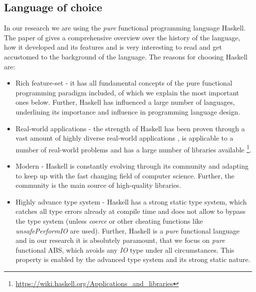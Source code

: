 \subsection{Language of choice}
In our research we are using the \textit{pure} functional programming language Haskell. The paper of \cite{hudak_history_2007} gives a comprehensive overview over the history of the language, how it developed and its features and is very interesting to read and get accustomed to the background of the language. The reasons for choosing Haskell are:

\begin{itemize}
	\item Rich feature-set - it has all fundamental concepts of the pure functional programming paradigm included, of which we explain the most important ones below. Further, Haskell has influenced a large number of languages, underlining its importance and influence in programming language design.
	
	\item Real-world applications - the strength of Haskell has been proven through a vast amount of highly diverse real-world applications \cite{hudak_history_2007, hudak_haskell_1994}, is applicable to a number of real-world problems \cite{osullivan_real_2008} and has a large number of libraries available \footnote{\url{https://wiki.haskell.org/Applications_and_libraries}}.
	
	\item Modern - Haskell is constantly evolving through its community and adapting to keep up with the fast changing field of computer science. Further, the community is the main source of high-quality libraries.
	
	\item Highly advance type system - Haskell has a strong static type system, which catches all type errors already at compile time and does not allow to bypass the type system (unless \textit{coerce} or other cheating functions like \textit{unsafePerformIO} are used). Further, Haskell is a \textit{pure} functional language and in our research it is absolutely paramount, that we focus on \textit{pure} functional ABS, which avoids any \textit{IO} type under all circumstances. This property is enabled by the advanced type system and its strong static nature.
\end{itemize}


